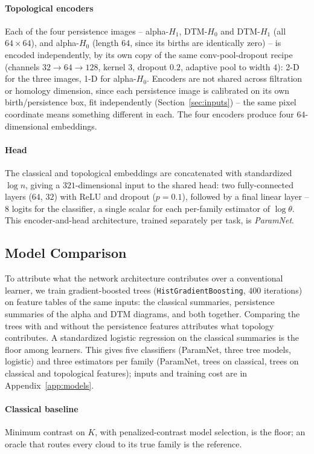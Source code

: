 \documentclass[twoside]{article}
\begin{document}
\paragraph{Topological encoders} Each of the four persistence images -- alpha-$H_1$, DTM-$H_0$ and DTM-$H_1$ (all $64\times64$), and alpha-$H_0$ (length $64$, since its births are identically zero) -- is encoded independently, by its own copy of the same conv-pool-dropout recipe (channels $32\to64\to128$, kernel $3$, dropout $0.2$, adaptive pool to width $4$): 2-D for the three images, 1-D for alpha-$H_0$. Encoders are not shared across filtration or homology dimension, since each persistence image is calibrated on its own birth/persistence box, fit independently (Section~\ref{sec:inputs}) -- the same pixel coordinate means something different in each. The four encoders produce four $64$-dimensional embeddings.

\paragraph{Head} The classical and topological embeddings are concatenated with standardized $\log n$, giving a $321$-dimensional input to the shared head: two fully-connected layers ($64$, $32$) with ReLU and dropout ($p=0.1$), followed by a final linear layer -- $8$ logits for the classifier, a single scalar for each per-family estimator of $\log\theta$. This encoder-and-head architecture, trained separately per task, is \emph{ParamNet}.


\subsection{Model Comparison}
\label{sec:learners}

To attribute what the network architecture contributes over a conventional learner, we train gradient-boosted trees (\texttt{HistGradientBoosting}, $400$ iterations) on feature tables of the same inputs: the classical summaries, persistence summaries of the alpha and DTM diagrams, and both together. Comparing the trees with and without the persistence features attributes what topology contributes. A standardized logistic regression on the classical summaries is the floor among learners. This gives five classifiers (ParamNet, three tree models, logistic) and three estimators per family (ParamNet, trees on classical, trees on classical and topological features); inputs and training cost are in Appendix~\ref{app:models}.

\paragraph{Classical baseline} Minimum contrast on $K$, with penalized-contrast model selection, is the floor; an oracle that routes every cloud to its true family is the reference.
\end{document}
